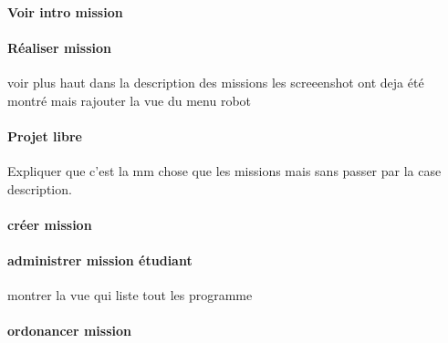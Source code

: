 \paragraph{Voir intro mission}

\paragraph{Réaliser mission} voir plus haut dans la description des missions les screeenshot ont deja été montré mais rajouter la vue du menu robot

\paragraph{Projet libre}
Expliquer que c'est la mm chose que les missions mais sans passer par la case description.

\paragraph{créer mission}

\paragraph{administrer mission étudiant} montrer la vue qui liste tout les programme

\paragraph{ordonancer mission}
